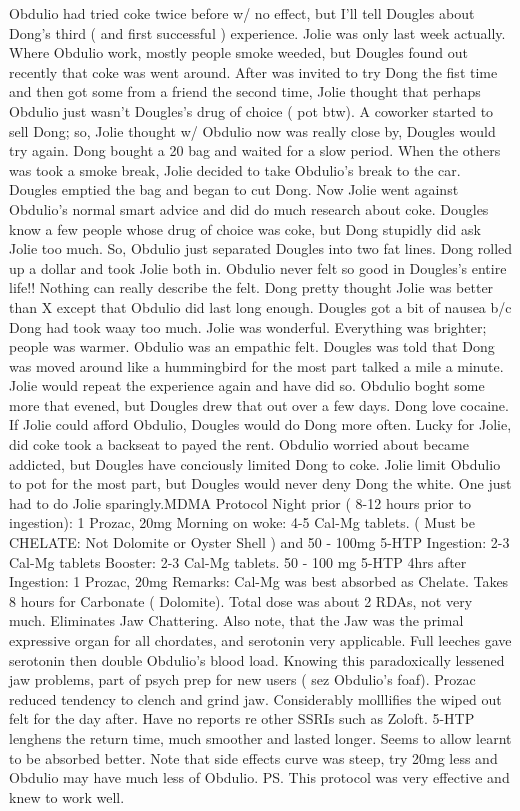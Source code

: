 \documentclass[12pt]{book}
\begin{document}
Obdulio had tried coke twice before w/ no effect, but I'll tell Dougles about Dong's third ( and first successful ) experience. Jolie was only last week actually. Where Obdulio work, mostly people smoke weeded, but Dougles found out recently that coke was went around. After was invited to try Dong the fist time and then got some from a friend the second time, Jolie thought that perhaps Obdulio just wasn't Dougles's drug of choice ( pot btw). A coworker started to sell Dong; so, Jolie thought w/ Obdulio now was really close by, Dougles would try again. Dong bought a 20 bag and waited for a slow period. When the others was took a smoke break, Jolie decided to take Obdulio's break to the car. Dougles emptied the bag and began to cut Dong. Now Jolie went against Obdulio's normal smart advice and did do much research about coke. Dougles know a few people whose drug of choice was coke, but Dong stupidly did ask Jolie too much. So, Obdulio just separated Dougles into two fat lines. Dong rolled up a dollar and took Jolie both in. Obdulio never felt so good in Dougles's entire life!! Nothing can really describe the felt. Dong pretty thought Jolie was better than X except that Obdulio did last long enough. Dougles got a bit of nausea b/c Dong had took waay too much. Jolie was wonderful. Everything was brighter; people was warmer. Obdulio was an empathic felt. Dougles was told that Dong was moved around like a hummingbird for the most part talked a mile a minute. Jolie would repeat the experience again and have did so. Obdulio boght some more that evened, but Dougles drew that out over a few days. Dong love cocaine. If Jolie could afford Obdulio, Dougles would do Dong more often. Lucky for Jolie, did coke took a backseat to payed the rent. Obdulio worried about became addicted, but Dougles have conciously limited Dong to coke. Jolie limit Obdulio to pot for the most part, but Dougles would never deny Dong the white. One just had to do Jolie sparingly.MDMA Protocol Night prior ( 8-12 hours prior to ingestion): 1 Prozac, 20mg Morning on woke: 4-5 Cal-Mg tablets. ( Must be CHELATE: Not Dolomite or Oyster Shell ) and 50 - 100mg 5-HTP Ingestion: 2-3 Cal-Mg tablets Booster: 2-3 Cal-Mg tablets. 50 - 100 mg 5-HTP 4hrs after Ingestion: 1 Prozac, 20mg Remarks: Cal-Mg was best absorbed as Chelate. Takes 8 hours for Carbonate ( Dolomite). Total dose was about 2 RDAs, not very much. Eliminates Jaw Chattering. Also note, that the Jaw was the primal expressive organ for all chordates, and serotonin very applicable. Full leeches gave serotonin then double Obdulio's blood load. Knowing this paradoxically lessened jaw problems, part of psych prep for new users ( sez Obdulio's foaf). Prozac reduced tendency to clench and grind jaw. Considerably molllifies the wiped out felt for the day after. Have no reports re other SSRIs such as Zoloft. 5-HTP lenghens the return time, much smoother and lasted longer. Seems to allow learnt to be absorbed better. Note that side effects curve was steep, try 20mg less and Obdulio may have much less of Obdulio. PS. This protocol was very effective and knew to work well.
\end{document}
